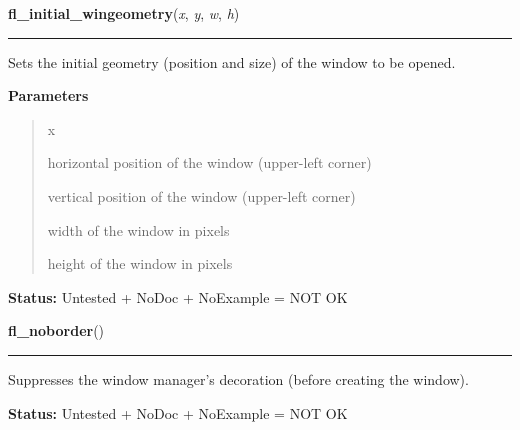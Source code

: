 \hspace{.8\funcindent}\begin{boxedminipage}{\funcwidth}

    \raggedright \textbf{fl\_initial\_wingeometry}(\textit{x}, \textit{y}, \textit{w}, \textit{h})

    \vspace{-1.5ex}

    \rule{\textwidth}{0.5\fboxrule}
\setlength{\parskip}{2ex}
    Sets the initial geometry (position and size) of the window to be 
    opened.

\setlength{\parskip}{1ex}
      \textbf{Parameters}
      \vspace{-1ex}

      \begin{quote}
        \begin{Ventry}{x}

          \item[x]

          horizontal position of the window (upper-left corner)

          \item[y]

          vertical position of the window (upper-left corner)

          \item[w]

          width of the window in pixels

          \item[h]

          height of the window in pixels

        \end{Ventry}

      \end{quote}

\textbf{Status:} Untested + NoDoc + NoExample = NOT OK



    \end{boxedminipage}

    \label{xformslib:library:fl_noborder}

    \vspace{0.5ex}

\hspace{.8\funcindent}\begin{boxedminipage}{\funcwidth}

    \raggedright \textbf{fl\_noborder}()

    \vspace{-1.5ex}

    \rule{\textwidth}{0.5\fboxrule}
\setlength{\parskip}{2ex}
    Suppresses the window manager's decoration (before creating the 
    window).

\setlength{\parskip}{1ex}
\textbf{Status:} Untested + NoDoc + NoExample = NOT OK



    \end{boxedminipage}

